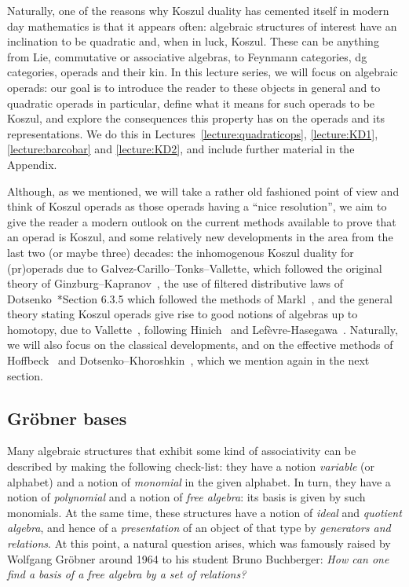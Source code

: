Naturally, one of the reasons why Koszul duality has cemented
itself in modern day mathematics is that it appears often:
algebraic structures of interest have an inclination to be
quadratic and, when in luck, Koszul. These can be anything
from Lie, commutative or associative algebras, to Feynmann
categories, dg categories, operads and their kin. In this
lecture series, we will focus on algebraic operads: our goal
is to introduce the reader to these objects in general
and to quadratic operads in particular, define what
it means for such operads to be Koszul, and explore
the consequences this property has on the operads
and its representations. We do this in Lectures~\ref{lecture:quadraticops}, \ref{lecture:KD1}, \ref{lecture:barcobar} and \ref{lecture:KD2}, and include further material
in the Appendix.

Although, as we
mentioned, we will take a rather old fashioned point of 
view and think of Koszul operads as those operads 
having a ``nice resolution'', we aim to give the reader
a modern outlook on the current methods available to
prove that an operad is Koszul, and some relatively 
new developments in the area from the last two (or
maybe three) decades:
the inhomogenous Koszul duality for (pr)operads due
to Galvez-Carillo--Tonks--Vallette, which
followed the original theory of 
Ginzburg--Kapranov~\cite{Ginzburg1994},
the use of filtered distributive laws 
of Dotsenko~\cite{Bremner2016}*{Section 6.3.5}
which followed the methods of Markl~\cite{MarklDistributive}, 
and the general theory stating Koszul operads give rise to good
notions of algebras up to homotopy, due to Vallette~\cite{Vallette2020},
following Hinich~\cite{Hinich2001} and Lefèvre-Hasegawa~\cite{LH03}.
Naturally, we will also focus on the classical developments,
and on the effective methods of Hoffbeck~\cite{Hoffbeck2009} and 
Dotsenko--Khoroshkin~\cite{Dotsenko2010}, which we mention again in
the next section.

\subsection{Gr\"obner bases}
Many algebraic structures that exhibit some kind of 
associativity can be described by making the following check-list:
they have a notion \emph{variable} (or alphabet) and a notion 
of \emph{monomial} in the given alphabet. In turn, they have
a notion of \emph{polynomial} and a notion of \emph{free algebra}:
its basis is given by such monomials.
At the same time, these structures have a notion of \emph{ideal} and
\emph{quotient algebra}, and hence of a \emph{presentation} of an object of that
type by \emph{generators and relations}.
At this point, a natural question arises, which was 
famously raised by Wolfgang Gr\"obner around 1964 to his student Bruno
Buchberger: \emph{How can one find a basis of a free algebra by
a set of relations?} 

